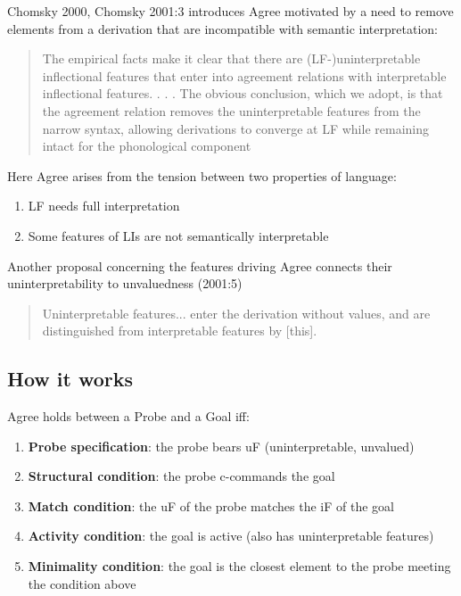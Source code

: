 Chomsky 2000, Chomsky 2001:3 introduces Agree motivated by a need to remove elements from a derivation that are incompatible with semantic interpretation:

\begin{quote}
The empirical facts make it clear that there are (LF-)uninterpretable inflectional features that enter into agreement relations with interpretable inflectional features. . . . The obvious conclusion, which we adopt, is that the agreement relation removes the uninterpretable features from the narrow syntax, allowing derivations to converge at LF while remaining intact for the phonological component

\end{quote}

Here Agree arises from the tension between two properties of language:

\begin{enumerate}
  \item LF needs full interpretation
  \item Some features of LIs are not semantically interpretable
\end{enumerate}

Another proposal concerning the features driving Agree connects their uninterpretability to unvaluedness (2001:5)

\begin{quote}
Uninterpretable features... enter the derivation without values, and are distinguished from interpretable features by [this].

\end{quote}

\subsection*{How it works}

Agree holds between a Probe and a Goal iff:

\begin{enumerate}
  \item \textbf{Probe specification}: the probe bears uF (uninterpretable, unvalued)
  \item \textbf{Structural condition}: the probe c-commands the goal
  \item \textbf{Match condition}: the uF of the probe matches the iF of the goal
  \item \textbf{Activity condition}: the goal is active (also has uninterpretable features)
  \item \textbf{Minimality condition}: the goal is the closest element to the probe meeting the condition above
\end{enumerate}

